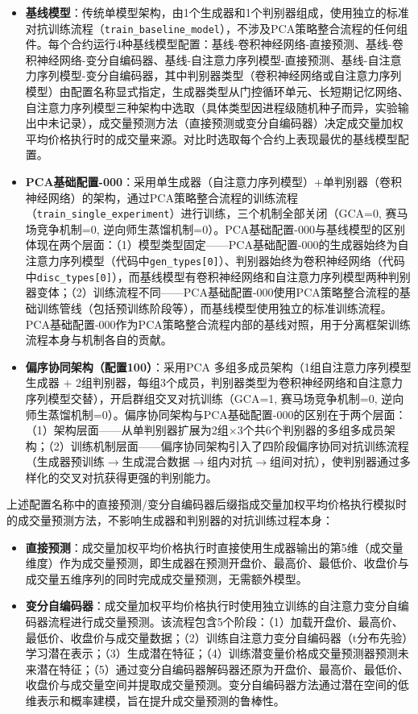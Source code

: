 \begin{itemize}
\item \textbf{基线模型}：传统单模型架构，由1个生成器和1个判别器组成，使用独立的标准对抗训练流程（\texttt{train\_baseline\_model}），不涉及PCA策略整合流程的任何组件。每个合约运行4种基线模型配置：基线-卷积神经网络-直接预测、基线-卷积神经网络-变分自编码器、基线-自注意力序列模型-直接预测、基线-自注意力序列模型-变分自编码器，其中判别器类型（卷积神经网络或自注意力序列模型）由配置名称显式指定，生成器类型从门控循环单元、长短期记忆网络、自注意力序列模型三种架构中选取（具体类型因进程级随机种子而异，实验输出中未记录），成交量预测方法（直接预测或变分自编码器）决定成交量加权平均价格执行时的成交量来源。对比时选取每个合约上表现最优的基线模型配置。
\item \textbf{PCA基础配置-000}：采用单生成器（自注意力序列模型）+单判别器（卷积神经网络）的架构，通过PCA策略整合流程的训练流程（\texttt{train\_single\_experiment}）进行训练，三个机制全部关闭（GCA=0, 赛马场竞争机制=0, 逆向师生蒸馏机制=0）。PCA基础配置-000与基线模型的区别体现在两个层面：（1）模型类型固定——PCA基础配置-000的生成器始终为自注意力序列模型（代码中\texttt{gen\_types[0]}）、判别器始终为卷积神经网络（代码中\texttt{disc\_types[0]}），而基线模型有卷积神经网络和自注意力序列模型两种判别器变体；（2）训练流程不同——PCA基础配置-000使用PCA策略整合流程的基础训练管线（包括预训练阶段等），而基线模型使用独立的标准训练流程。PCA基础配置-000作为PCA策略整合流程内部的基线对照，用于分离框架训练流程本身与机制各自的贡献。
\item \textbf{偏序协同架构（配置100）}：采用PCA 多组多成员架构（1组自注意力序列模型生成器 + 2组判别器，每组3个成员，判别器类型为卷积神经网络和自注意力序列模型交替），开启群组交叉对抗训练（GCA=1, 赛马场竞争机制=0, 逆向师生蒸馏机制=0）。偏序协同架构与PCA基础配置-000的区别在于两个层面：（1）架构层面——从单判别器扩展为2组$\times$3个共6个判别器的多组多成员架构；（2）训练机制层面——偏序协同架构引入了四阶段偏序协同对抗训练流程（生成器预训练$\to$生成混合数据$\to$组内对抗$\to$组间对抗），使判别器通过多样化的交叉对抗获得更强的判别能力。
\end{itemize}

上述配置名称中的直接预测/变分自编码器后缀指成交量加权平均价格执行模拟时的成交量预测方法，不影响生成器和判别器的对抗训练过程本身：
\begin{itemize}
\item \textbf{直接预测}：成交量加权平均价格执行时直接使用生成器输出的第5维（成交量维度）作为成交量预测，即生成器在预测开盘价、最高价、最低价、收盘价与成交量五维序列的同时完成成交量预测，无需额外模型。
\item \textbf{变分自编码器}：成交量加权平均价格执行时使用独立训练的自注意力变分自编码器流程进行成交量预测。该流程包含5个阶段：（1）加载开盘价、最高价、最低价、收盘价与成交量数据；（2）训练自注意力变分自编码器（t分布先验）学习潜在表示；（3）生成潜在特征；（4）训练潜变量价格成交量预测器预测未来潜在特征；（5）通过变分自编码器解码器还原为开盘价、最高价、最低价、收盘价与成交量空间并提取成交量预测。变分自编码器方法通过潜在空间的低维表示和概率建模，旨在提升成交量预测的鲁棒性。
\end{itemize}

